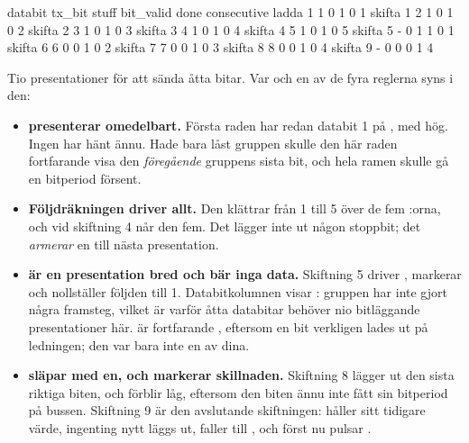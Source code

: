 \begin{textdrawing}
          databit  tx_bit  stuff  bit_valid  done  consecutive
ladda           1       1      0          1     0            1
skifta 1        2       1      0          1     0            2
skifta 2        3       1      0          1     0            3
skifta 3        4       1      0          1     0            4
skifta 4        5       1      0          1     0            5
skifta 5        -       0      1          1     0            1
skifta 6        6       0      0          1     0            2
skifta 7        7       0      0          1     0            3
skifta 8        8       0      0          1     0            4
skifta 9        -       0      0          0     1            4
\end{textdrawing}

Tio presentationer för att sända åtta bitar. Var och en av de fyra reglerna syns i den:
\begin{itemize}
  \item \textbf{ presenterar omedelbart.} Första raden har redan databit 1 på
    , med  hög. Ingen  har hänt ännu. Hade  bara
    låst gruppen skulle den här raden fortfarande visa den \emph{föregående} gruppens sista bit, och
    hela ramen skulle gå en bitperiod försent.
  \item \textbf{Följdräkningen driver allt.} Den klättrar från 1 till 5 över de fem :orna,
    och vid skiftning 4 når den fem. Det lägger inte ut någon stoppbit; det \emph{armerar} en till
    nästa presentation.
  \item \textbf{ är en presentation bred och bär inga data.} Skiftning 5 driver
    , markerar  och nollställer följden till 1.
    Databitkolumnen visar \code{-}: gruppen har inte gjort några framsteg, vilket är varför åtta
    databitar behöver nio bitläggande presentationer här.  är fortfarande ,
    eftersom en bit verkligen lades ut på ledningen; den var bara inte en av dina.
  \item \textbf{ släpar med en, och  markerar skillnaden.} Skiftning 8
    lägger ut den sista riktiga biten, och  förblir låg, eftersom den biten ännu inte fått
    sin bitperiod på bussen. Skiftning 9 är den avslutande skiftningen:  håller sitt
    tidigare värde, ingenting nytt läggs ut,  faller till , och först nu
    pulsar .
\end{itemize}

